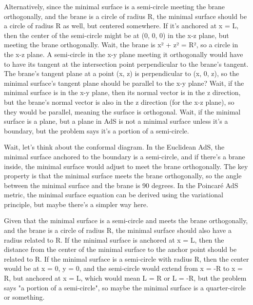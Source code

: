 Alternatively, since the minimal surface is a semi-circle meeting the brane orthogonally, and the brane is a circle of radius R, the minimal surface should be a circle of radius R as well, but centered somewhere. If it's anchored at x = L, then the center of the semi-circle might be at (0, 0, 0) in the x-z plane, but meeting the brane orthogonally. Wait, the brane is x² + z² = R², so a circle in the x-z plane. A semi-circle in the x-y plane meeting it orthogonally would have to have its tangent at the intersection point perpendicular to the brane's tangent. The brane's tangent plane at a point (x, z) is perpendicular to (x, 0, z), so the minimal surface's tangent plane should be parallel to the x-y plane? Wait, if the minimal surface is in the x-y plane, then its normal vector is in the z direction, but the brane's normal vector is also in the z direction (for the x-z plane), so they would be parallel, meaning the surface is orthogonal. Wait, if the minimal surface is a plane, but a plane in AdS is not a minimal surface unless it's a boundary, but the problem says it's a portion of a semi-circle. 

Wait, let's think about the conformal diagram. In the Euclidean AdS, the minimal surface anchored to the boundary is a semi-circle, and if there's a brane inside, the minimal surface would adjust to meet the brane orthogonally. The key property is that the minimal surface meets the brane orthogonally, so the angle between the minimal surface and the brane is 90 degrees. In the Poincaré AdS metric, the minimal surface equation can be derived using the variational principle, but maybe there's a simpler way here. 

Given that the minimal surface is a semi-circle and meets the brane orthogonally, and the brane is a circle of radius R, the minimal surface should also have a radius related to R. If the minimal surface is anchored at x = L, then the distance from the center of the minimal surface to the anchor point should be related to R. If the minimal surface is a semi-circle with radius R, then the center would be at x = 0, y = 0, and the semi-circle would extend from x = -R to x = R, but anchored at x = L, which would mean L = R or L = -R, but the problem says "a portion of a semi-circle", so maybe the minimal surface is a quarter-circle or something. 

